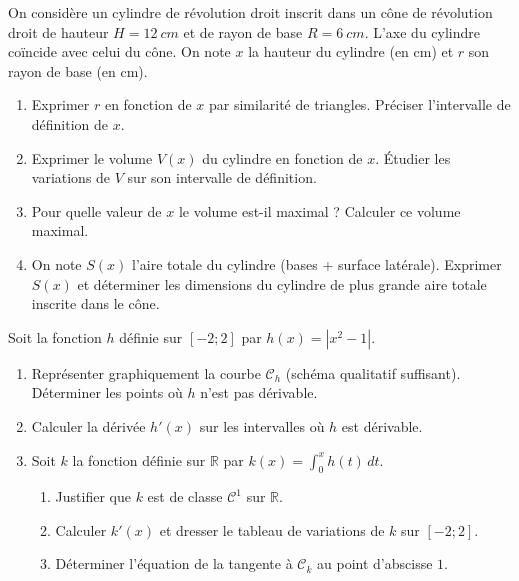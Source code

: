 \documentclass[11pt]{article}
\begin{document}
\begin{exercice}
On considère un cylindre de révolution droit inscrit dans un cône de révolution droit de hauteur $H = \SI{12}{cm}$ et de rayon de base $R = \SI{6}{cm}$. L'axe du cylindre coïncide avec celui du cône. On note $x$ la hauteur du cylindre (en cm) et $r$ son rayon de base (en cm).
\begin{enumerate}
    \item Exprimer $r$ en fonction de $x$ par similarité de triangles. Préciser l'intervalle de définition de $x$.
    \item Exprimer le volume $V(x)$ du cylindre en fonction de $x$. Étudier les variations de $V$ sur son intervalle de définition.
    \item Pour quelle valeur de $x$ le volume est-il maximal ? Calculer ce volume maximal.
    \item On note $S(x)$ l'aire totale du cylindre (bases + surface latérale). Exprimer $S(x)$ et déterminer les dimensions du cylindre de plus grande aire totale inscrite dans le cône.
\end{enumerate}
\end{exercice}

\begin{exercice}
Soit la fonction $h$ définie sur $[-2; 2]$ par $h(x) = |x^2 - 1|$.
\begin{enumerate}
    \item Représenter graphiquement la courbe $\mathcal{C}_h$ (schéma qualitatif suffisant). Déterminer les points où $h$ n'est pas dérivable.
    \item Calculer la dérivée $h'(x)$ sur les intervalles où $h$ est dérivable.
    \item Soit $k$ la fonction définie sur $\mathbb{R}$ par $k(x) = \int_0^x h(t)\,dt$.
    \begin{enumerate}
        \item Justifier que $k$ est de classe $\mathcal{C}^1$ sur $\mathbb{R}$.
        \item Calculer $k'(x)$ et dresser le tableau de variations de $k$ sur $[-2; 2]$.
        \item Déterminer l'équation de la tangente à $\mathcal{C}_k$ au point d'abscisse $1$.
    \end{enumerate}
\end{enumerate}
\end{exercice}
\end{document}
